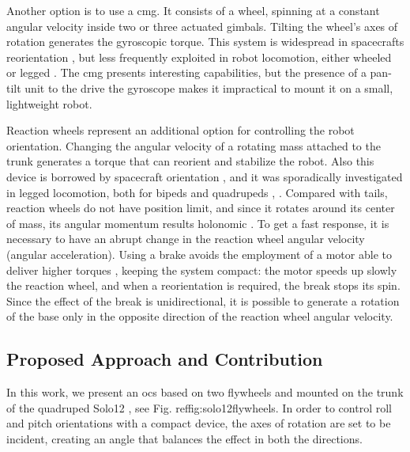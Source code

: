 \documentclass[journal,letterpaper]{IEEEtran}
\begin{document}
Another option is to use a \acrfull{cmg}.
It consists of a wheel, spinning at a constant angular velocity inside two or three actuated gimbals.
Tilting the wheel's axes of rotation generates the gyroscopic torque.
This system is widespread in spacecrafts reorientation \cite{yoon2002spacecraft}, but less frequently exploited in robot locomotion, either wheeled \cite{brown1996single} or legged \cite{mikhalkov2021gyrubot}.
The \acrshort{cmg} presents interesting capabilities, but the presence of a pan-tilt  unit to the drive the gyroscope makes it impractical to mount it on a small, lightweight robot.

Reaction wheels represent an additional option for controlling the robot orientation.
Changing the angular velocity of a rotating mass attached to the trunk generates a torque that can reorient and stabilize the robot. Also this device is borrowed by spacecraft orientation \cite{oland2009reaction}, and it was sporadically investigated in legged locomotion, both for bipeds \cite{Brown2016}  \cite{xiong2020sequential} and quadrupeds \cite{kolvenbach2019towards}, \cite{vasilopoulos2016quadruped}.
Compared with tails, reaction wheels do not have position limit, and since it rotates around its center of mass, its angular momentum results holonomic \cite{machairas2015quadruped}.
To get a fast response, it is necessary to have an abrupt change in the reaction wheel angular velocity (angular acceleration).
Using a brake avoids the employment of a motor able to deliver higher torques \cite{gajamohan2012cubli}, keeping the system compact: the motor speeds up slowly the reaction wheel, and when a reorientation is required, the break stops its spin.
Since the effect of the break is unidirectional, it is possible to generate a rotation of the base only in the opposite direction of the reaction wheel angular velocity.

\subsection{Proposed Approach and Contribution}
In this work, we present an \acrfull{ocs} based on two flywheels and mounted on the trunk of the quadruped Solo12 \cite{grimminger2020open}, see Fig. ref{fig:solo12flywheels}. In order to control roll and pitch orientations with a compact device, the axes of rotation are set to be incident, creating an angle that balances the effect in both the directions. 
\end{document}
